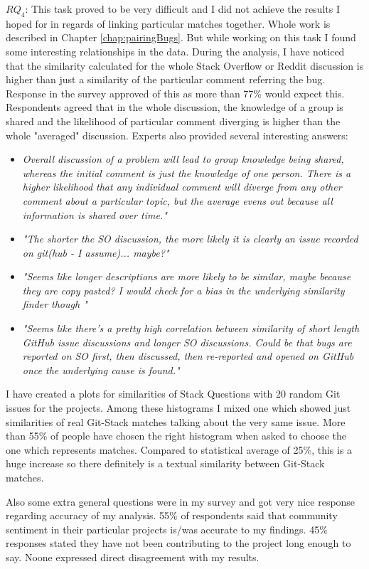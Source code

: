 \textbf{$RQ_{4}$}: This task proved to be very difficult and I did not achieve the results I hoped for in regards of linking particular matches together. Whole work is described in Chapter \ref{chap:pairingBugs}. But while working on this task I found some interesting relationships in the data. During the analysis, I have noticed that the similarity calculated for the whole Stack Overflow or Reddit discussion is higher than just a similarity of the particular comment referring the bug. Response in the survey approved of this as more than 77\% would expect this. Respondents agreed that in the whole discussion, the knowledge of a group is shared and the likelihood of particular comment diverging is higher than the whole "averaged" discussion. Experts also provided several interesting answers:
\begin{itemize}
\item \textit{Overall discussion of a problem will lead to group knowledge being shared, whereas the initial comment is just the knowledge of one person. There is a higher likelihood that any individual comment will diverge from any other comment about a particular topic, but the average evens out because all information is shared over time."}
\item \textit{"The shorter the SO discussion, the more likely it is clearly an issue recorded on git(hub - I assume)... maybe?"}
\item \textit{"Seems like longer descriptions are more likely to be similar, maybe because they are copy pasted? I would check for a bias in the underlying similarity finder though
"}
\item \textit{"Seems like there's a pretty high correlation between similarity of short length GitHub issue discussions and longer SO discussions. Could be that bugs are reported on SO first, then discussed, then re-reported and opened on GitHub once the underlying cause is found."}
\end{itemize} I have created a plots for similarities of Stack Questions with 20 random Git issues for the projects. Among these histograms I mixed one which showed just similarities of real Git-Stack matches talking about the very same issue. More than 55\% of people have chosen the right histogram when asked to choose the one which represents matches. Compared to statistical average of 25\%, this is a huge increase so there definitely is a textual similarity between Git-Stack matches.


Also some extra general questions were in my survey and got very nice response regarding accuracy of my analysis. 55\% of respondents said that community sentiment in their particular projects is/was accurate to my findings. 45\% responses stated they have not been contributing to the project long enough to say. Noone expressed direct disagreement with my results.